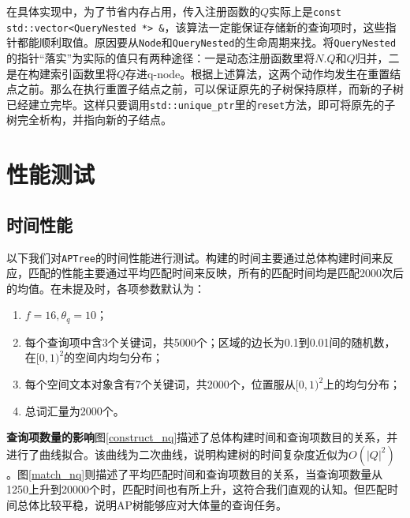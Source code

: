 \documentclass[UTF8]{ctexart}
\begin{document}
在具体实现中，为了节省内存占用，传入注册函数的$Q$实际上是\texttt{const std::vector<QueryNested *> \&}，该算法一定能保证存储新的查询项时，这些指针都能顺利取值。原因要从\texttt{Node}和\texttt{QueryNested}的生命周期来找。将\texttt{QueryNested}的指针“落实”为实际的值只有两种途径：一是动态注册函数里将$N.Q$和$Q$归并，二是在构建索引函数里将$Q$存进q-node。根据上述算法，这两个动作均发生在重置结点之前。那么在执行重置子结点之前，可以保证原先的子树保持原样，而新的子树已经建立完毕。这样只要调用\texttt{std::unique\_ptr}里的\texttt{reset}方法，即可将原先的子树完全析构，并指向新的子结点。

\section{性能测试}
\subsection{时间性能}
以下我们对\texttt{APTree}的时间性能进行测试。构建的时间主要通过总体构建时间来反应，匹配的性能主要通过平均匹配时间来反映，所有的匹配时间均是匹配2000次后的均值。在未提及时，各项参数默认为：
\begin{enumerate}[1)]
\item $f=16, \theta_q=10$；
\item 每个查询项中含3个关键词，共5000个；区域的边长为0.1到0.01间的随机数，在$[0, 1)^2$的空间内均匀分布；
\item 每个空间文本对象含有7个关键词，共2000个，位置服从$[0, 1)^2上$的均匀分布；
\item 总词汇量为2000个。
\end{enumerate}

\textbf{查询项数量的影响}\quad 图\ref{construct_nq}描述了总体构建时间和查询项数目的关系，并进行了曲线拟合。该曲线为二次曲线，说明构建树的时间复杂度近似为$O(|Q|^2)$。图\ref{match_nq}则描述了平均匹配时间和查询项数目的关系，当查询项数量从1250上升到20000个时，匹配时间也有所上升，这符合我们直观的认知。但匹配时间总体比较平稳，说明AP树能够应对大体量的查询任务。
\end{document}

